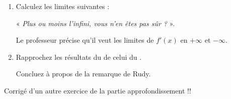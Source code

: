 \begin{exercice}
\begin{enumerate}
\item Calculez les limites suivantes :\label{homo4}
« \emph{Plus ou moins l'infini, vous n'en êtes pas sûr ?} ».\par
Le professeur précise qu'il veut les limites de $f'(x)$ en $+\infty$ et $-\infty$.
\item Rapprochez les résultats du   de celui du .\par
Concluez à propos de la remarque de Rudy.
\end{enumerate}

\begin{corrige}
Corrigé d'un autre exercice de la partie approfondissement !!
\end{corrige}
\end{exercice}


